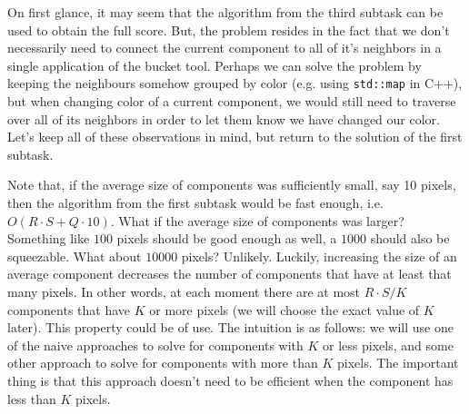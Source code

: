 On first glance, it may seem that the algorithm from the third subtask
can be used to obtain the full score. But, the problem resides in the fact
that we don't necessarily need to connect the current component to all
of it's neighbors in a single application of the bucket tool. Perhaps we
can solve the problem by keeping the neighbours somehow grouped by color
(e.g. using \verb|std::map| in C++), but when changing color of a current
component, we would still need to traverse over all of its neighbors in order
to let them know we have changed our color. Let's keep all of these observations
in mind, but return to the solution of the first subtask.

Note that, if the average size of components was sufficiently small, say 10
pixels, then the algorithm from the first subtask would be fast enough, i.e.
$O(R \cdot S + Q \cdot 10)$. What if the average size of components was larger?
Something like $100$ pixels should be good enough as well, a $1000$ should also
be squeezable. What about $10000$ pixels? Unlikely. Luckily, increasing the
size of an average component decreases the number of components that have at
least that many pixels. In other words, at each moment there are at most $R
\cdot S / K$ components that have $K$ or more pixels (we will choose the exact
value of $K$ later). This property could be of use. The intuition is as
follows: we will use one of the naive approaches to solve for components with
$K$ or less pixels, and some other approach to solve for components with more
than $K$ pixels.  The important thing is that this approach doesn't need to be
efficient when the component has less than $K$ pixels.

